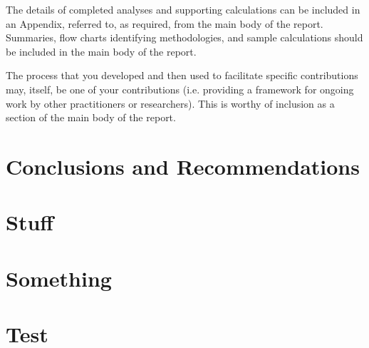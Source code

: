 \documentclass[]{article}
\begin{document}
The details of completed analyses and supporting calculations can be included in an Appendix, referred to, as required, from the main body of the report.  Summaries, flow charts identifying methodologies, and sample calculations should be included in the main body of the report.

The process that you developed and then used to facilitate specific contributions may, itself, be one of your contributions (i.e. providing a framework for ongoing work by other practitioners or researchers).  This is worthy of inclusion as a section of the main body of the report.
\color{black}

\section{Conclusions and Recommendations}


\newpage
\appendix

\newpage

\section{Stuff}


\newpage
\section{Something}


\section{Test}
	


\end{document}
